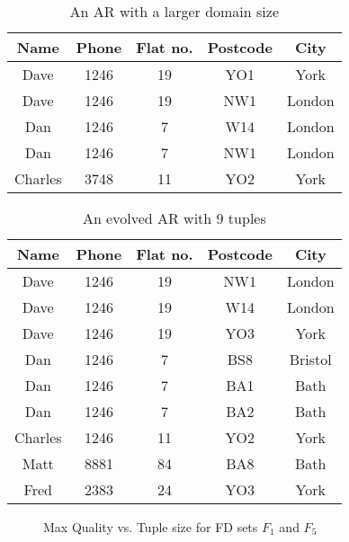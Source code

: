 {\line
\begin{table}[ht]
\begin{center}
\begin{tabular}{|c|c|c|c|c|} \hline 
{ \bf Name} & { \bf Phone} & {\bf Flat no. }  & { \bf Postcode}  & {\bf City} \\ \hline
Dave & 1246 & 19 & YO1 & York  \\
Dave & 1246 & 19 & NW1 & London \\
Dan & 1246 & 7 & W14 & London \\
Dan & 1246 & 7 & NW1 & London \\
Charles & 3748 & 11 & YO2 & York \\ \hline
\end{tabular}
\end{center}
\caption{\label{table:5.33} An AR with a larger domain size }
\end{table}
}

{\line
\begin{table}
\begin{center}
\begin{tabular}{|c|c|c|c|c|} \hline 
{ \bf Name} & { \bf Phone} & {\bf Flat no. }  & { \bf Postcode}  & {\bf City} \\ \hline
Dave & 1246 & 19 & NW1 & London  \\
Dave & 1246 & 19 & W14 & London \\
Dave & 1246 & 19 & YO3 & York \\
Dan & 1246 & 7 & BS8 & Bristol \\
Dan & 1246 & 7 & BA1 & Bath \\
Dan & 1246 & 7 & BA2 & Bath \\
Charles & 1246 & 11 & YO2 & York \\
Matt & 8881 & 84 & BA8 & Bath \\
Fred & 2383 & 24 & YO3 & York \\ \hline
\end{tabular}
\end{center}
\caption{\label{table:5.34} An evolved AR with 9 tuples }
\end{table}
}

\medskip

\begin{figure}
\centerline{}
\caption{\label{graph:93_60}\scriptsize{Max Quality vs. Tuple size for FD sets $F_1$ and $F_5$ }}
\end{figure}

